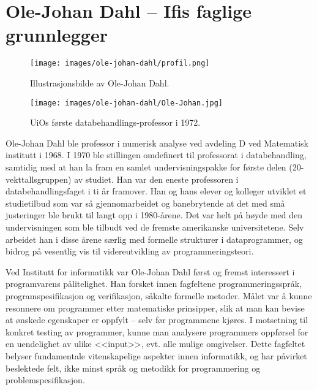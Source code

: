 \chapter[Ole-Johan Dahl]{Ole-Johan Dahl -- Ifis faglige grunnlegger}

\author{Skrevet av Narve Trædal}

\begin{wrapfigure}{r}{6cm}
	\centering
	\texttt{[image: images/ole-johan-dahl/profil.png]}
	\label{fig:ole-johan-dahl}
	\caption{Illustrasjonsbilde av Ole-Johan Dahl.}
\end{wrapfigure}

\begin{figure}[h!]
	\texttt{[image: images/ole-johan-dahl/Ole-Johan.jpg]}
	\label{fig:ole-johan}
	\caption{UiOs første databehandlings-professor i 1972.}
\end{figure}

Ole-Johan Dahl ble professor i numerisk analyse ved avdeling D ved Matematisk institutt i 1968. I 1970 ble stillingen omdefinert til professorat i databehandling, samtidig med at han la fram en samlet undervisningspakke for første delen (20-vekttallsgruppen) av studiet. Han var den eneste professoren i databehandlingsfaget i ti år framover. Han og hans elever og kolleger utviklet et studietilbud som var så gjennomarbeidet og banebrytende at det med små justeringer ble brukt til langt opp i 1980-årene. Det var helt på høyde med den undervisningen som ble tilbudt ved de fremste amerikanske universitetene. Selv arbeidet han i disse årene særlig med formelle strukturer i dataprogrammer, og bidrog på vesentlig vis til videreutvikling av programmeringsteori.

Ved Institutt for informatikk var Ole-Johan Dahl først og fremst interessert i programvarens pålitelighet. Han forsket innen fagfeltene programmeringsspråk, programspesifikasjon og verifikasjon, såkalte formelle metoder. Målet var å kunne resonnere om programmer etter matematiske prinsipper, slik at man kan bevise at ønskede egenskaper er oppfylt – selv før programmene kjøres. I motsetning til konkret testing av programmer, kunne man analysere programmers oppførsel for en uendelighet av ulike <<input>>, evt. alle mulige omgivelser. Dette fagfeltet belyser fundamentale vitenskapelige aspekter innen informatikk, og har påvirket beslektede felt, ikke minst språk og metodikk for programmering og problemspesifikasjon.

